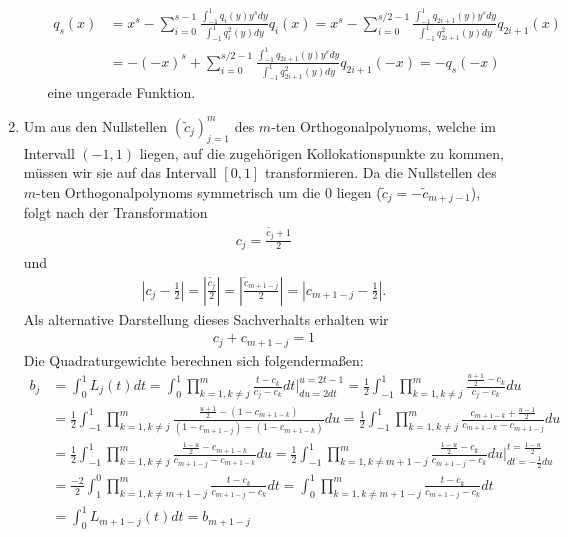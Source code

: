 \begin{solution}
\begin{enumerate}[label = \textbf{\alph*)}]
\begin{itemize}
  \begin{align*}
    q_s(x) &= x^s - \sum_{i = 0}^{s-1}\frac{\int_{-1}^1 q_i(y) y^s dy}{\int_{-1}^1 q_i^2(y) dy}q_i(x)
    = x^s - \sum_{i = 0}^{s/2-1}\frac{\int_{-1}^1q_{2i+1}(y)y^s dy}{\int_{-1}^1q_{2i+1}^2(y)dy}q_{2i+1}(x)\\
    &= -(-x)^s +
    \sum_{i = 0}^{s/2-1}\frac{\int_{-1}^1q_{2i+1}(y)y^s dy}{\int_{-1}^1q_{2i+1}^2(y)dy}q_{2i+1}(-x)
    = -q_s(-x)
  \end{align*}
  eine ungerade Funktion.
\end{itemize}
\item Um aus den Nullstellen $(\widetilde{c}_j)_{j = 1}^m$ des $m$-ten Orthogonalpolynoms,
welche im Intervall $(-1,1)$ liegen, auf die zugehörigen Kollokationspunkte zu kommen,
müssen wir sie auf das Intervall $[0,1]$ transformieren.
Da die Nullstellen des $m$-ten Orthogonalpolynoms symmetrisch um die $0$ liegen
($\widetilde{c}_j = -\widetilde{c}_{m+j-1}$), folgt nach der Transformation
\begin{align*}
  c_j = \frac{\widetilde{c_j} + 1}{2}
\end{align*}
und
\begin{align*}
  \left|c_j - \frac{1}{2}\right| = \left|\frac{\widetilde{c_j}}{2}\right| =
  \left|\frac{\widetilde{c}_{m+1-j}}{2}\right| = \left|c_{m+1-j} - \frac{1}{2}\right|.
\end{align*}
Als alternative Darstellung dieses Sachverhalts erhalten wir
\begin{align*}
  c_j + c_{m + 1 - j} = 1
\end{align*}
Die Quadraturgewichte berechnen sich folgendermaßen:
\begin{align*}
  b_j &= \int_{0}^1 L_j(t) dt
  = \int_0^1 \prod_{k = 1, k \neq j}^m\frac{t - c_k}{c_j - c_k} dt \bigg|_{du = 2dt}^{u = 2t - 1}
  = \frac{1}{2}\int_{-1}^1  \prod_{k = 1, k \neq j}^m\frac{\frac{u+1}{2} - c_k}{c_j - c_k} du \\
  &= \frac{1}{2}\int_{-1}^1  \prod_{k = 1, k \neq j}^m\frac{\frac{u+1}{2} - (1 - c_{m+1-k})}
  {(1 - c_{m+1-j}) - (1 - c_{m+1-k})} du
  = \frac{1}{2}\int_{-1}^1  \prod_{k = 1, k \neq j}^m\frac{c_{m+1-k} + \frac{u-1}{2}}
  {c_{m+1-k} - c_{m+1-j}} du \\
  &= \frac{1}{2}\int_{-1}^1  \prod_{k = 1, k \neq j}^m\frac{\frac{1-u}{2} - c_{m+1-k}}
  {c_{m+1-j} - c_{m+1-k}} du
  = \frac{1}{2}\int_{-1}^1  \prod_{k = 1, k \neq m+1-j}^m\frac{\frac{1-u}{2} - c_{k}}
  {c_{m+1-j} - c_{k}} du \bigg|_{dt = -\frac{1}{2}du}^{t = \frac{1-u}{2}} \\
  &= \frac{-2}{2}\int_{1}^0  \prod_{k = 1, k \neq m+1-j}^m\frac{t - c_{k}}
  {c_{m+1-j} - c_{k}} dt
  = \int_{0}^1  \prod_{k = 1, k \neq m+1-j}^m\frac{t - c_{k}}
  {c_{m+1-j} - c_{k}} dt \\
  &= \int_0^1 L_{m+1-j}(t) dt = b_{m+1-j}
\end{align*}

\end{enumerate}
\end{solution}
